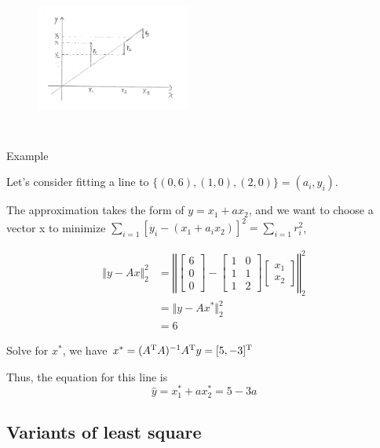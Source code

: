 \begin{figure}
	\centering
	\includegraphics[width=2in,height=2in]{figures/ch06/ch06-02.jpg}
\end{figure}



\vspace{0.5cm}
Example

Let's consider fitting a line to $\{(0,6),(1,0),(2,0) \}={(a_i,y_i)}.$

The approximation takes the form of $y=x_1+ax_2$, and we want to choose a vector x to minimize $\sum_{i=1}[y_i-(x_1+a_ix_2)]^2 = \sum_{i=1} r_i^2$,

\begin{align*}
\Vert y- Ax\Vert_2^2 
&=
\left\Vert
\begin{bmatrix}
6\\
0\\
0
\end{bmatrix}
-
\begin{bmatrix}
1&0\\
1&1\\
1&2
\end{bmatrix}
\begin{bmatrix}
x_1\\
x_2
\end{bmatrix}
\right\Vert_2^2\\
&=\Vert y-Ax^*\Vert^2_2\\
&=6
\end{align*}

Solve for $x^*$, we have
$x^*=(A^{{\rm T}}A)^{-1}A^{{\rm T}}y=[5 , -3]^{{\rm T}}$

Thus, the equation for this line is
$$\hat{y}=x_1^*+ax_2^*=5-3a$$            %




\subsection{Variants of least square}

